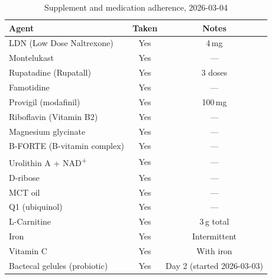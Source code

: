 \begin{table}[h]
\centering
\caption{Supplement and medication adherence, 2026-03-04}
\label{tab:adherence-2026-03-04}
\begin{tabular}{lcc}
\toprule
Agent & Taken & Notes \\
\midrule
LDN (Low Dose Naltrexone)                   & Yes & 4\,mg \\
Montelukast                                  & Yes & --- \\
Rupatadine (Rupatall)                        & Yes & 3 doses \\
Famotidine                                   & Yes & --- \\
Provigil (modafinil)                         & Yes & 100\,mg \\
Riboflavin (Vitamin B2)                      & Yes & --- \\
Magnesium glycinate                          & Yes & --- \\
B-FORTE (B-vitamin complex)                  & Yes & --- \\
Urolithin A + NAD\textsuperscript{+}         & Yes & --- \\
D-ribose                                     & Yes & --- \\
MCT oil                                      & Yes & --- \\
Q1 (ubiquinol)                               & Yes & --- \\
L-Carnitine                                  & Yes & 3\,g total \\
Iron                                         & Yes & Intermittent \\
Vitamin C                                    & Yes & With iron \\
Bactecal gelules (probiotic)                 & Yes & Day 2 (started 2026-03-03) \\
\bottomrule
\end{tabular}
\end{table}


